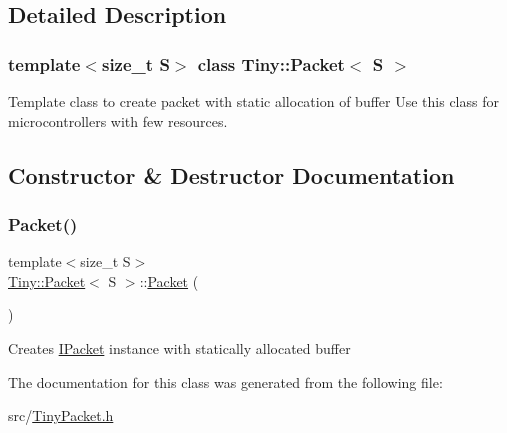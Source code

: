 \subsection{Detailed Description}
\subsubsection*{template$<$size\+\_\+t S$>$\newline
class Tiny\+::\+Packet$<$ S $>$}

Template class to create packet with static allocation of buffer Use this class for microcontrollers with few resources. 

\subsection{Constructor \& Destructor Documentation}
\mbox{\label{classTiny_1_1Packet_a81a8b302018e7091616e5c853b005201}} 
\subsubsection{\texorpdfstring{Packet()}{Packet()}}
{\footnotesize\ttfamily template$<$size\+\_\+t S$>$ \\
\hyperlink{classTiny_1_1Packet}{Tiny\+::\+Packet}$<$ S $>$\+::\hyperlink{classTiny_1_1Packet}{Packet} (\begin{DoxyParamCaption}{ }\end{DoxyParamCaption})\hspace{0.3cm}{\ttfamily [inline]}}

Creates \hyperlink{classTiny_1_1IPacket}{I\+Packet} instance with statically allocated buffer 

The documentation for this class was generated from the following file\+:\begin{DoxyCompactItemize}
\item 
src/\hyperlink{TinyPacket_8h}{Tiny\+Packet.\+h}\end{DoxyCompactItemize}
